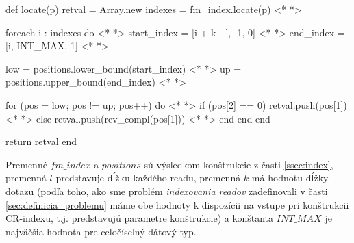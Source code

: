 \bigskip
\begin{pseudocode}[label=lst:cr_index_query,caption={Algoritmus dotazu \emph{locate} CR-indexu nad readmi bez chýb.}]
def locate(p)
  retval = Array.new
  indexes = fm_index.locate(p) <* \label{lst:cr_index_query_locate} *>  
  
  foreach i : indexes do <* \label{lst:cr_index_query_foreach} *>  
    start_index = [i + k - l, -1, 0] <* \label{lst:cr_index_query_start_index} *>  
    end_index = [i, INT_MAX, 1] <* \label{lst:cr_index_query_end_index} *>  
    
    low = positions.lower_bound(start_index) <* \label{lst:cr_index_query_low} *>  
    up = positions.upper_bound(end_index) <* \label{lst:cr_index_query_up} *>  
    
    for (pos = low; pos != up; pos++) do <* \label{lst:cr_index_query_foreach2} *>
      if (pos[2] == 0)
        retval.push(pos[1]) <* \label{lst:cr_index_query_push_read} *>
      else
        retval.push(rev_compl(pos[1])) <* \label{lst:cr_index_query_push_rev_compl} *>
      end
    end
  end
  
  return retval
end
\end{pseudocode}
\bigskip

Premenné $fm\_index$ a $positions$ sú výsledkom konštrukcie z časti \ref{ssec:index}, premenná $l$ predstavuje dĺžku každého readu, premenná $k$ má hodnotu dĺžky dotazu (podľa toho, ako sme problém \emph{indexovania readov} zadefinovali v časti \ref{sec:definicia_problemu} máme obe hodnoty k dispozícii na vstupe pri konštrukcii CR-indexu, t.j. predstavujú parametre konštrukcie) a konštanta $INT\_MAX$ je najväčšia hodnota pre celočíselný dátový typ.

